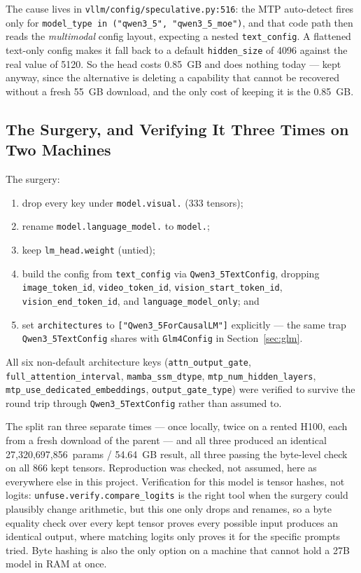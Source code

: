 \documentclass[11pt]{article}
\begin{document}
The cause lives in \texttt{vllm/config/speculative.py:516}: the MTP auto-detect fires
only for \texttt{model\_type in ("qwen3\_5", "qwen3\_5\_moe")}, and that code path then
reads the \emph{multimodal} config layout, expecting a nested \texttt{text\_config}. A
flattened text-only config makes it fall back to a default \texttt{hidden\_size} of 4096
against the real value of 5120. So the head costs 0.85~GB and does nothing today ---
kept anyway, since the alternative is deleting a capability that cannot be recovered
without a fresh 55~GB download, and the only cost of keeping it is the 0.85~GB.

\subsection{The Surgery, and Verifying It Three Times on Two Machines}

The surgery:
\begin{enumerate}[nosep,leftmargin=1.5em]
\item drop every key under \texttt{model.visual.} (333 tensors);
\item rename \texttt{model.language\_model.} to \texttt{model.};
\item keep \texttt{lm\_head.weight} (untied);
\item build the config from \texttt{text\_config} via \texttt{Qwen3\_5TextConfig},
  dropping \texttt{image\_token\_id}, \texttt{video\_token\_id},
  \texttt{vision\_start\_token\_id}, \texttt{vision\_end\_token\_id}, and
  \texttt{language\_model\_only}; and
\item set \texttt{architectures} to \texttt{["Qwen3\_5ForCausalLM"]} explicitly --- the
  same trap \texttt{Qwen3\_5TextConfig} shares with \texttt{Glm4Config} in
  Section~\ref{sec:glm}.
\end{enumerate}
All six non-default architecture keys (\texttt{attn\_output\_gate},
\texttt{full\_attention\_interval}, \texttt{mamba\_ssm\_dtype},
\texttt{mtp\_num\_hidden\_layers}, \texttt{mtp\_use\_dedicated\_embeddings},
\texttt{output\_gate\_type}) were verified to survive the round trip through
\texttt{Qwen3\_5TextConfig} rather than assumed to.

The split ran three separate times --- once locally, twice on a rented H100, each from a
fresh download of the parent --- and all three produced an identical
27,320,697,856~params / 54.64~GB result, all three passing the byte-level check on all
866 kept tensors. Reproduction was checked, not assumed, here as everywhere else in this
project. Verification for this model is tensor hashes, not logits:
\texttt{unfuse.verify.compare\_logits} is the right tool when the surgery could plausibly
change arithmetic, but this one only drops and renames, so a byte equality check over
every kept tensor proves every possible input produces an identical output, where
matching logits only proves it for the specific prompts tried. Byte hashing is also the
only option on a machine that cannot hold a 27B model in RAM at once.
\end{document}
